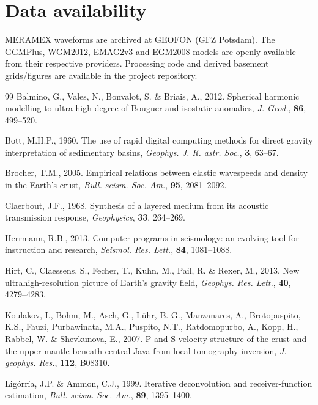 \section*{Data availability}
MERAMEX waveforms are archived at GEOFON (GFZ Potsdam). The GGMPlus, WGM2012,
EMAG2v3 and EGM2008 models are openly available from their respective providers.
Processing code and derived basement grids/figures are available in the project
repository.

\begin{thebibliography}{99}
\small
{} Balmino, G., Vales, N., Bonvalot, S.
\& Briais, A., 2012. Spherical harmonic modelling to ultra-high degree of Bouguer
and isostatic anomalies, \emph{J. Geod.}, \textbf{86}, 499--520.

 Bott, M.H.P., 1960. The use of rapid digital
computing methods for direct gravity interpretation of sedimentary basins,
\emph{Geophys. J. R. astr. Soc.}, \textbf{3}, 63--67.

 Brocher, T.M., 2005. Empirical relations
between elastic wavespeeds and density in the Earth's crust, \emph{Bull. seism.
Soc. Am.}, \textbf{95}, 2081--2092.

 Claerbout, J.F., 1968. Synthesis of a
layered medium from its acoustic transmission response, \emph{Geophysics},
\textbf{33}, 264--269.

 Herrmann, R.B., 2013. Computer programs in
seismology: an evolving tool for instruction and research, \emph{Seismol. Res.
Lett.}, \textbf{84}, 1081--1088.

 Hirt, C., Claessens, S., Fecher, T., Kuhn,
M., Pail, R. \& Rexer, M., 2013. New ultrahigh-resolution picture of Earth's
gravity field, \emph{Geophys. Res. Lett.}, \textbf{40}, 4279--4283.

 Koulakov, I., Bohm, M., Asch, G.,
Lühr, B.-G., Manzanares, A., Brotopuspito, K.S., Fauzi, Purbawinata, M.A.,
Puspito, N.T., Ratdomopurbo, A., Kopp, H., Rabbel, W. \& Shevkunova, E., 2007. P
and S velocity structure of the crust and the upper mantle beneath central Java
from local tomography inversion, \emph{J. geophys. Res.}, \textbf{112}, B08310.

 Lig\'orr\'ia, J.P. \& Ammon,
C.J., 1999. Iterative deconvolution and receiver-function estimation, \emph{Bull.
seism. Soc. Am.}, \textbf{89}, 1395--1400.


\end{thebibliography}
